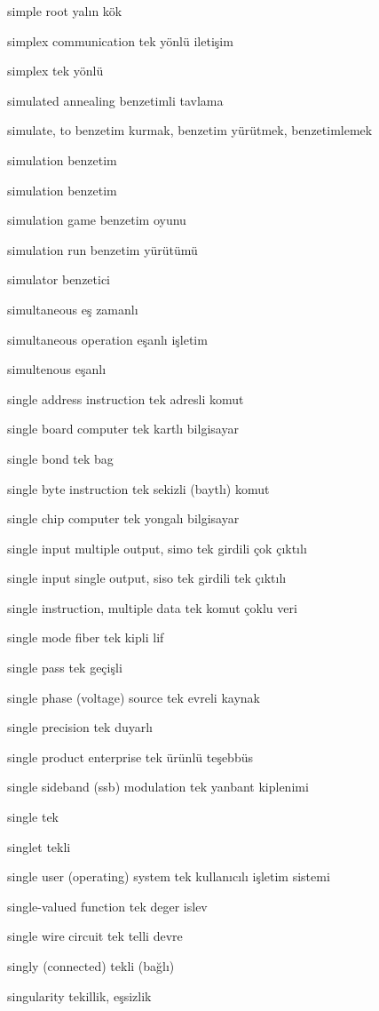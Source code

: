 \documentclass[12pt,fleqn]{article}\usepackage{../../common}
\begin{document}
simple root yalın kök

simplex communication tek yönlü iletişim

simplex tek yönlü

simulated annealing benzetimli tavlama

simulate, to benzetim kurmak, benzetim yürütmek, benzetimlemek

simulation benzetim

simulation benzetim

simulation game benzetim oyunu

simulation run benzetim yürütümü

simulator benzetici

simultaneous eş zamanlı

simultaneous operation eşanlı işletim

simultenous eşanlı

single address instruction tek adresli komut

single board computer tek kartlı bilgisayar

single bond tek bag

single byte instruction tek sekizli (baytlı) komut

single chip computer tek yongalı bilgisayar

single input multiple output, simo tek girdili çok çıktılı

single input single output, siso tek girdili tek çıktılı

single instruction, multiple data tek komut çoklu veri

single mode fiber tek kipli lif

single pass tek geçişli

single phase (voltage) source tek evreli kaynak

single precision tek duyarlı

single product enterprise tek ürünlü teşebbüs

single sideband (ssb) modulation tek yanbant kiplenimi

single tek

singlet tekli

single user (operating) system tek kullanıcılı işletim sistemi

single-valued function tek deger islev

single wire circuit tek telli devre

singly (connected) tekli (bağlı)

singularity tekillik, eşsizlik
\end{document}
